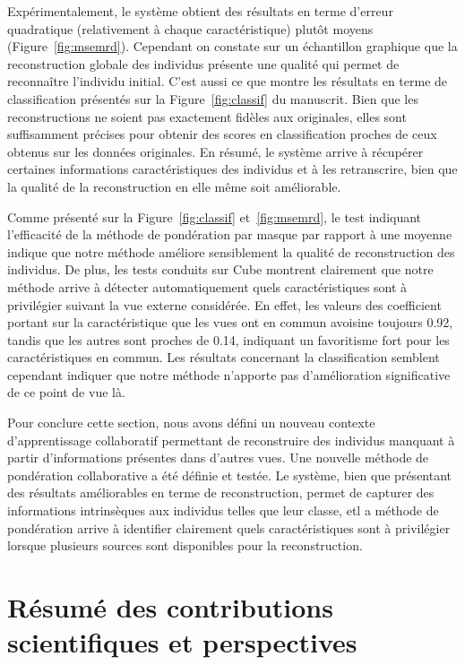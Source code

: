 Expérimentalement, le système obtient des résultats en terme d'erreur quadratique (relativement à chaque caractéristique) plutôt moyens (Figure~\ref{fig:msemrd}). Cependant on constate sur un échantillon graphique que la reconstruction globale des individus présente une qualité qui permet de reconnaître l'individu initial. C'est aussi ce que montre les résultats en terme de classification présentés sur la Figure~\ref{fig:classif} du manuscrit. Bien que les reconstructions ne soient pas exactement fidèles aux originales, elles sont suffisamment précises pour obtenir des scores en classification proches de ceux obtenus sur les données originales. En résumé, le système arrive à récupérer certaines informations caractéristiques des individus et à les retranscrire, bien que la qualité de la reconstruction en elle m\^{e}me soit améliorable.

Comme présenté sur la Figure~\ref{fig:classif} et~\ref{fig:msemrd}, le test indiquant l'efficacité de la méthode de pondération par masque par rapport à une moyenne indique que notre méthode améliore sensiblement la qualité de reconstruction des individus. De plus, les tests conduits sur Cube montrent clairement que notre méthode arrive à détecter automatiquement quels caractéristiques sont à privilégier suivant la vue externe considérée. En effet, les valeurs des coefficient portant sur la caractéristique que les vues ont en commun avoisine toujours 0.92, tandis que les autres sont proches de 0.14, indiquant un favoritisme fort pour les caractéristiques en commun. Les résultats concernant la classification semblent cependant indiquer que notre méthode n'apporte pas d'amélioration significative de ce point de vue là.

Pour conclure cette section, nous avons défini un nouveau contexte d'apprentissage collaboratif permettant de reconstruire des individus manquant à partir d'informations présentes dans d'autres vues. Une nouvelle méthode de pondération collaborative a été définie et testée. Le système, bien que présentant des résultats améliorables en terme de reconstruction, permet de capturer des informations intrinsèques aux individus telles que leur classe, etl a méthode de pondération arrive à identifier clairement quels caractéristiques sont à privilégier lorsque plusieurs sources sont disponibles pour la reconstruction.

\section{R\'{e}sum\'{e} des contributions scientifiques et perspectives}

